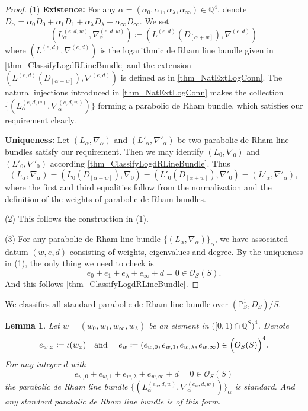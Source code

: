 \documentclass[12pt,twoside]{book}
\theoremstyle{plain}
\newtheorem{lemma}[lemma]{Lemma}
\theoremstyle{definition}
\theoremstyle{remark}
\newcommand{\bP}{{\mathbb P}}
\newcommand{\bQ}{{\mathbb Q}}
\newcommand{\mO}{{\mathcal O}}
\numberwithin{equation}{section}
\begin{document}
\begin{proof}
(1) \textbf{Existence:} For any $\alpha=(\alpha_0,\alpha_1,\alpha_\lambda,\alpha_\infty)\in\bQ^4$, denote $D_\alpha = \alpha_0D_0 + \alpha_1D_1 + \alpha_\lambda D_ \lambda+ \alpha_\infty D_\infty$. We set
\[(L^{(e,d,w)}_\alpha,\nabla^{(e,d,w)}_\alpha) \coloneqq (L^{(e,d)}(D_{[\alpha+w]}),\nabla^{(e,d)})\]
where $(L^{(e,d)},\nabla^{(e,d)})$ is the logarithmic de Rham line bundle given in \autoref{thm_ClassifyLogdRLineBundle} and the extension $(L^{(e,d)}(D_{[\alpha+w]}),\nabla^{(e,d)})$ is defined as in \autoref{thm_NatExtLogConn}. The natural injections introduced in \autoref{thm_NatExtLogConn} makes the collection $\{(L^{(e,d,w)}_\alpha,\nabla^{(e,d,w)}_\alpha)\}$ forming a parabolic de Rham bundle, which satisfies our requirement clearly.

\textbf{Uniqueness:} Let $(L_\alpha,\nabla_\alpha)$ and $(L'_\alpha,\nabla'_\alpha)$ be two parabolic de Rham line bundles satisfy our requirement. Then we may identify $(L_0,\nabla_0)$ and $(L'_0,\nabla'_0)$ according \autoref{thm_ClassifyLogdRLineBundle}. Thus
\[(L_\alpha,\nabla_\alpha) = (L_0(D_{[\alpha+w]}),\nabla_0) = (L'_0(D_{[\alpha+w]}),\nabla'_0) =(L'_\alpha,\nabla'_\alpha),\]
where the first and third equalities follow from the normalization and the definition of the weights of parabolic de Rham bundles.

(2) This follows the construction in (1).

(3) For any parabolic de Rham line bundle $\{(L_\alpha,\nabla_\alpha)\}_{\alpha}$, we have associated datum $(w,e,d)$ consisting of weights, eigenvalues and degree. By the uniqueness in (1), the only thing we need to check is \[e_0+e_1+e_\lambda+e_\infty + d = 0 \in \mO_S(S).\]
And this follows \autoref{thm_ClassifyLogdRLineBundle}.
\end{proof}

We classifies all standard parabolic de Rham line bundle over $(\bP^1_S,D_S)/S$.
\begin{lemma} Let $w=(w_0,w_1,w_\infty,w_\lambda)$ be an element in $\Big([0,1)\cap \bQ^S\Big)^4$. Denote
\[e_{w,x}\coloneqq\iota(w_x) \text{\quad and \quad} e_w\coloneqq(e_{w,0},e_{w,1},e_{w,\lambda},e_{w,\infty})\in \Big(O_S(S)\Big)^4.\]
For any integer $d$ with
\[e_{w,0}+e_{w,1}+e_{w,\lambda}+e_{w,\infty}+d=0\in \mO_S(S)\]
the parabolic de Rham line bundle $\{(L^{(e_w,d,w)}_\alpha,\nabla^{(e_w,d,w)}_\alpha)\}_{\alpha}$ is standard. And any standard parabolic de Rham line bundle is of this form.
\end{lemma}
\end{document}
